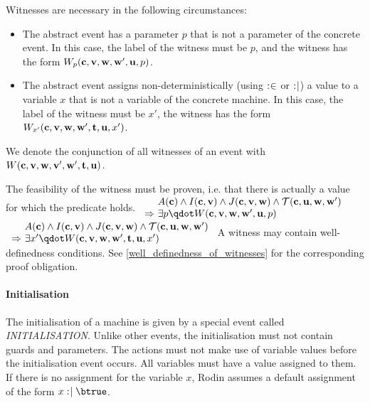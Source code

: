 Witnesses are necessary in the following circumstances:
\begin{itemize}
\item The abstract event has a parameter $p$ that is not a parameter of the concrete  event.
  In this case, the label of the witness must be $p$, and the witness has the form 
  $W_p(\mathbf{c},{\mathbf{v},\mathbf{w}},\mathbf{w}',\mathbf{u},p)$.
\item The abstract event assigns non-deterministically (using $\mathrel{:\mkern1mu\in}$ or $\mathrel{:\mkern1mu\mid}$) 
  a value to a variable $x$ that is not a variable of the concrete machine.
  In this case, the label of the witness must be $x'$, the witness has the form
  $W_{x'}(\mathbf{c},{\mathbf{v},\mathbf{w}},\mathbf{w}',{\mathbf{t},\mathbf{u}},x')$.
\end{itemize}
We denote the conjunction of all witnesses of an event with $W(\mathbf{c},{\mathbf{v},\mathbf{w}},\mathbf{v}',\mathbf{w}',{\mathbf{t},\mathbf{u}})$.

The feasibility of the witness must be proven, i.e. that there is actually a value for which the predicate holds.
%
  {$\begin{array}{r@{\ }l}
      & \axioms \land \absinvariants \land \concinvariants \land \bapred \\
      \limp & \exists p \qdot W(\allconstants,\allvariables,\concvariables',\concparameters,p)      
    \end{array}$}
%
  {$\begin{array}{r@{\ }l}
      & \axioms \land \absinvariants \land \concinvariants \land \bapred \\
      \limp & \exists x' \qdot W(\allconstants,\allvariables,\concvariables',\allparameters,x')
    \end{array}$}
A witness may contain well-definedness conditions. See \ref{well_definedness_of_witnesses}
  for the corresponding proof obligation.

\paragraph{Initialisation}
\label{initialization}
The initialisation of a machine is given by a special event called \textsl{INITIALISATION}.
Unlike other events, the initialisation must not contain guards and parameters.
The actions must not make use of variable values before the initialisation event occurs.
All variables must have a value assigned to them. If there is no assignment for the variable $x$, Rodin assumes a default assignment of the form $x\bcmsuch \btrue$.

